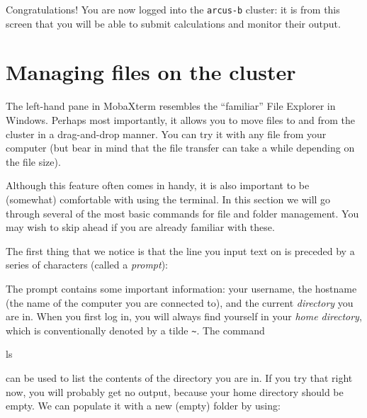 \documentclass[10pt]{article}
\begin{document}

Congratulations! You are now logged into the \texttt{arcus-b} cluster: it is from this screen that you will be able to submit calculations and monitor their output.

\section{Managing files on the cluster}

The left-hand pane in MobaXterm resembles the ``familiar'' File Explorer in Windows. Perhaps most importantly, it allows you to move files to and from the cluster in a drag-and-drop manner. You can try it with any file from your computer (but bear in mind that the file transfer can take a while depending on the file size).

Although this feature often comes in handy, it is also important to be (somewhat) comfortable with using the terminal. In this section we will go through several of the most basic commands for file and folder management. You may wish to skip ahead if you are already familiar with these.

The first thing that we notice is that the line you input text on is preceded by a series of characters (called a \textit{prompt}):


The prompt contains some important information: your username, the hostname (the name of the computer you are connected to), and the current \textit{directory} you are in. When you first log in, you will always find yourself in your \textit{home directory}, which is conventionally denoted by a tilde \texttt{\textasciitilde}. The command 

\begin{cmdline}
ls
\end{cmdline}

can be used to list the contents of the directory you are in. If you try that right now, you will probably get no output, because your home directory should be empty. We can populate it with a new (empty) folder by using:
\end{document}
